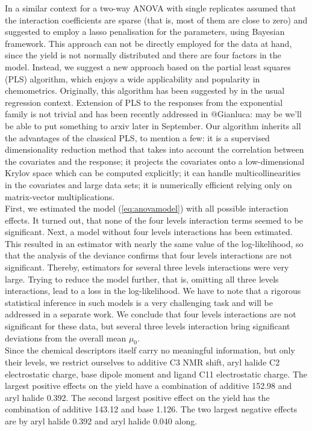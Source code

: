 \documentclass[12pt]{article}
\begin{document}
In a similar context for a two-way ANOVA with single replicates \citet{GRIFFIN2019181} assumed that the interaction coefficients are sparse (that is, most of them are close to zero) and suggested to employ a lasso penalisation for the parameters, using Bayesian framework. This approach can not be directly employed for the data at hand, since the yield is not normally distributed and there are four factors in the model. Instead, we suggest a new approach based on the partial least squares (PLS) algorithm, which enjoys a wide applicability and popularity in chemometrics. Originally, this algorithm has been suggested by \citet{Wold66} in the usual regression context. Extension of PLS to the responses from the exponential family is not trivial and has been recently addressed in {\color{red}@Gianluca: may be we'll be able to put something to arxiv later in September.} {\color{red} Our algorithm inherits all the advantages of the classical PLS, to mention a few: it is a supervised dimensionality reduction method that takes into account the correlation between the covariates and the response; it projects the covariates onto a low-dimensional Krylov space which can be computed explicitly; it can handle multicollinearities in the covariates and large data sets; it is numerically efficient relying only on matrix-vector multiplications.} \\
First, we estimated the model (\ref{eq:anovamodel}) with all possible interaction effects. It turned out, that none of the four levels interaction terms seemed to be significant. Next, a model without four levels interactions has been estimated. This resulted in an estimator with nearly the same value of the log-likelihood, so that the analysis of the deviance confirms that four levels interactions are not significant. Thereby, estimators for several three levels interactions were very large. Trying to reduce the model further, that is, omitting all three levels interactions, lead to a loss in the log-likelihood. We have to note that a rigorous statistical inference in such models is a very challenging task and will be addressed in a separate work. We conclude that four levels interactions are not significant for these data, but several three levels interaction bring significant deviations from the overall mean $\mu_0$. \\
Since the chemical descriptors itself carry no meaningful information, but only their levels, we restrict ourselves to {\color{blue} additive C3 NMR shift, aryl halide C2 electrostatic charge, base dipole moment and ligand C11 electrostatic charge}. The largest positive effects on the yield have a combination of {\color{blue} additive 152.98} and {\color{blue} aryl halide 0.392}. The second largest positive effect on the yield has the combination of {\color{blue} additive 143.12} and {\color{blue} base 1.126}. The two largest negative effects are by {\color{blue} aryl halide 0.392} and {\color{blue} aryl halide 0.040} along. \\
\end{document}
